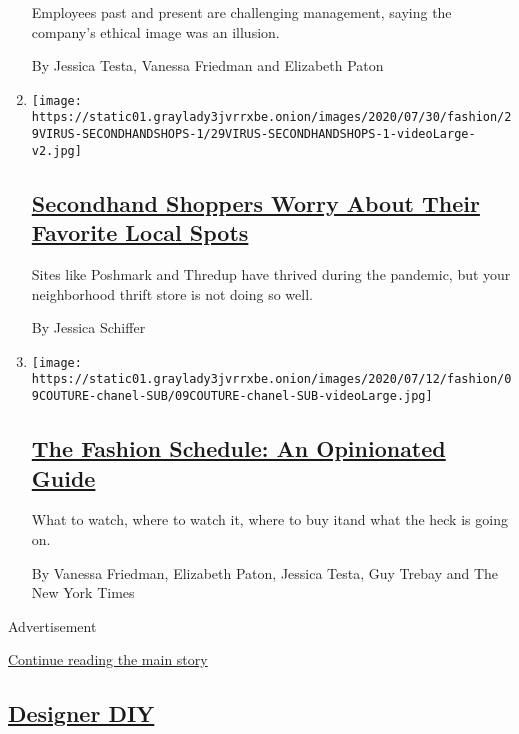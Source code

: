 \begin{enumerate}
  Employees past and present are challenging management, saying the
  company's ethical image was an illusion.

  By Jessica Testa, Vanessa Friedman and Elizabeth Paton
\item
  \texttt{[image: https://static01.graylady3jvrrxbe.onion/images/2020/07/30/fashion/29VIRUS-SECONDHANDSHOPS-1/29VIRUS-SECONDHANDSHOPS-1-videoLarge-v2.jpg]}

  \hypertarget{secondhand-shoppers-worry-about-their-favorite-local-spots}{%
  \subsection{\texorpdfstring{\href{/2020/07/29/style/secondhand-clothes-coronavirus-safety.html}{Secondhand
  Shoppers Worry About Their Favorite Local
  Spots}}{Secondhand Shoppers Worry About Their Favorite Local Spots}}\label{secondhand-shoppers-worry-about-their-favorite-local-spots}}

  Sites like Poshmark and Thredup have thrived during the pandemic, but
  your neighborhood thrift store is not doing so well.

  By Jessica Schiffer
\item
  \texttt{[image: https://static01.graylady3jvrrxbe.onion/images/2020/07/12/fashion/09COUTURE-chanel-SUB/09COUTURE-chanel-SUB-videoLarge.jpg]}

  \hypertarget{the-fashion-schedule-an-opinionated-guide}{%
  \subsection{\texorpdfstring{\href{/article/fashion-week-trends-2020.html}{The
  Fashion Schedule: An Opinionated
  Guide}}{The Fashion Schedule: An Opinionated Guide}}\label{the-fashion-schedule-an-opinionated-guide}}

  What to watch, where to watch it, where to buy itand what the heck is
  going on.

  By Vanessa Friedman, Elizabeth Paton, Jessica Testa, Guy Trebay and
  The New York Times
\end{enumerate}

Advertisement

\protect\hyperlink{after-mid1}{Continue reading the main story}

\hypertarget{designer-diy}{%
\subsection{\texorpdfstring{\href{/issue/fashion/2020/06/19/designer-diy}{Designer
DIY}}{Designer DIY}}\label{designer-diy}}

